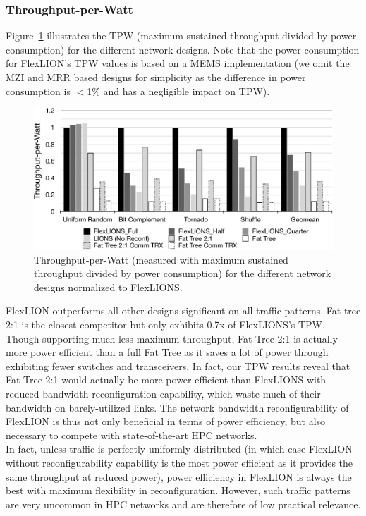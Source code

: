 \subsubsection{Throughput-per-Watt}
Figure~\ref{fig:tpw} illustrates the TPW (maximum sustained throughput divided by power consumption) for the different network designs. Note that the power consumption for FlexLION's TPW values is based on a MEMS implementation (we omit the MZI and MRR based designs for simplicity as the difference in power consumption is $<$1\% and has a negligible impact on TPW). 
\begin{figure}[t!]
    \centering
        \includegraphics[width=\linewidth, clip]{Figures/tpw.pdf}
    \caption[Throughput-per-Watt (measured with maximum sustained throughput divided by power consumption) for the  different network designs normalized to FlexLION.]{Throughput-per-Watt (measured with maximum sustained throughput divided by power consumption) for the  different network designs normalized to FlexLIONS.}
    \label{fig:tpw}
\end{figure}
FlexLION outperforms all other designs significant on all traffic patterns. Fat tree 2:1 is the closest competitor but only exhibits 0.7x of FlexLIONS's TPW. Though supporting much less maximum throughput, Fat Tree 2:1 is actually more power efficient than a full Fat Tree as it saves a lot of power through exhibiting fewer switches and transceivers. In fact, our TPW results reveal that Fat Tree 2:1 would actually be more power efficient than FlexLIONS with reduced bandwidth reconfiguration capability, which waste much of their bandwidth on barely-utilized links. The network bandwidth reconfigurability of FlexLION is thus not only beneficial in terms of power efficiency, but also necessary to compete with state-of-the-art HPC networks. \\
In fact, unless traffic is perfectly uniformly distributed (in which case FlexLION without reconfigurability capability is the most power efficient as it provides the same throughput at reduced power), power efficiency in FlexLION is always the best with maximum flexibility in reconfiguration. However, such traffic patterns are very uncommon in HPC networks and are therefore of low practical relevance. 

